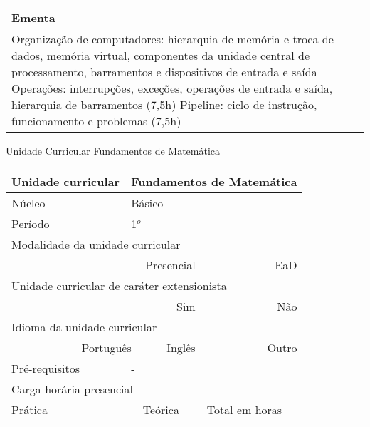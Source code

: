 \begin{quadro}[h!]
\begin{tabular}{|p{3cm} p{2cm} p{3cm} p{2cm} p{3cm} p{2cm}|}
\multicolumn{6}{|p{15cm}|}{\cellcolor{blue1} Ementa} \\\hline
\hline\multicolumn{6}{|p{15cm}|}{\scriptsize Organização de computadores: hierarquia de memória e troca de dados, memória virtual, componentes da unidade central de processamento, barramentos e dispositivos de entrada e saída Operações: interrupções, exceções, operações de entrada e saída, hierarquia de barramentos (7,5h) Pipeline: ciclo de instrução, funcionamento e problemas (7,5h)}\\\hline
\hline
	\end{tabular}
\end{quadro}
\begin{quadro}[h!]
  \centering\scriptsize
\caption{Unidade Curricular Fundamentos de Matemática}
\label{ unit_3 }
\begin{tabular}{|p{3cm} p{2cm} p{3cm} p{2cm} p{3cm} p{2cm}|}\hline
\multicolumn{1}{|p{3cm}|}{\cellcolor{blue1} Unidade curricular} & \multicolumn{5}{p{9cm}|}{ Fundamentos de Matemática }\\\hline
\multicolumn{1}{|p{3cm}|}{\cellcolor{blue1} Núcleo} & \multicolumn{5}{p{11.5cm}|}{ Básico }\\\hline
\multicolumn{1}{|p{3cm}|}{\cellcolor{blue1} Período} & \multicolumn{5}{p{9cm}|}{ 1$^o$ }\\\hline
\multicolumn{6}{|p{15cm}|}{\cellcolor{blue1} Modalidade da unidade curricular} \\\hline
\multicolumn{2}{|r}{		} &  \multicolumn{2}{r}{Presencial \XBox } & \multicolumn{2}{r|}{EaD \Square	} \\\hline
\multicolumn{6}{|p{15cm}|}{\cellcolor{blue1} Unidade curricular de caráter extensionista} \\\hline
\multicolumn{4}{|r}{			Sim \Square	} & \multicolumn{2}{r|}{	Não \XBox	}\\\hline
\multicolumn{6}{|p{15cm}|}{\cellcolor{blue1} Idioma da unidade curricular} \\ \hline
\multicolumn{2}{|r}{	Português \XBox	} &  \multicolumn{2}{r}{	Inglês \Square	} & \multicolumn{2}{r|}{	Outro \Square	} \\ \hline
\multicolumn{1}{|p{3cm}|}{\cellcolor{blue1} Pré-requisitos} & \multicolumn{5}{p{9cm}|}{ - }\\ \hline
\multicolumn{6}{|p{15cm}|}{\cellcolor{blue1} Carga horária presencial} \\ \hline
\multicolumn{1}{|p{3cm}|}{\raggedleft Prática} & \multicolumn{1}{p{1cm}|}{\centering	30	} &  \multicolumn{1}{p{3cm}|}{\raggedleft Teórica}  & \multicolumn{1}{p{1cm}|}{\centering 	30 } & \multicolumn{1}{p{3cm}|}{\raggedleft Total em horas} & \multicolumn{1}{p{1cm}|}{\raggedleft	60	} \\ \hline

\end{tabular}
\end{quadro}
